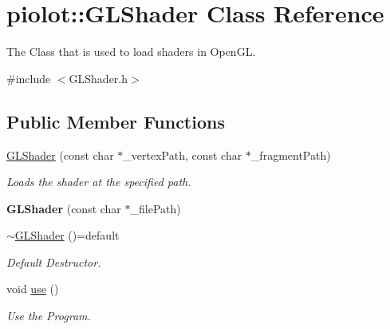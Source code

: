 \hypertarget{classpiolot_1_1_g_l_shader}{}\section{piolot\+:\+:G\+L\+Shader Class Reference}
\label{classpiolot_1_1_g_l_shader}


The Class that is used to load shaders in Open\+GL.  




{\ttfamily \#include $<$G\+L\+Shader.\+h$>$}

\subsection*{Public Member Functions}
\begin{DoxyCompactItemize}
\item 
\mbox{\hyperlink{classpiolot_1_1_g_l_shader_a9280ae5003e53461f898dd18b7685eab}{G\+L\+Shader}} (const char $\ast$\+\_\+vertex\+Path, const char $\ast$\+\_\+fragment\+Path)
\begin{DoxyCompactList}\small\item\em Loads the shader at the specified path. \end{DoxyCompactList}\item 
\mbox{\label{classpiolot_1_1_g_l_shader_a1ed833e8b2ade593d5c820981121bfbb}} 
{\bfseries G\+L\+Shader} (const char $\ast$\+\_\+file\+Path)
\item 
\mbox{\label{classpiolot_1_1_g_l_shader_a7bf14037e4f1f1e5b6af344da08d6430}} 
\mbox{\hyperlink{classpiolot_1_1_g_l_shader_a7bf14037e4f1f1e5b6af344da08d6430}{$\sim$\+G\+L\+Shader}} ()=default
\begin{DoxyCompactList}\small\item\em Default Destructor. \end{DoxyCompactList}\item 
\mbox{\label{classpiolot_1_1_g_l_shader_a624427668ba51101fe898e12731069bf}} 
void \mbox{\hyperlink{classpiolot_1_1_g_l_shader_a624427668ba51101fe898e12731069bf}{use}} ()
\begin{DoxyCompactList}\small\item\em Use the Program. \end{DoxyCompactList}\item 

\end{DoxyCompactItemize}
